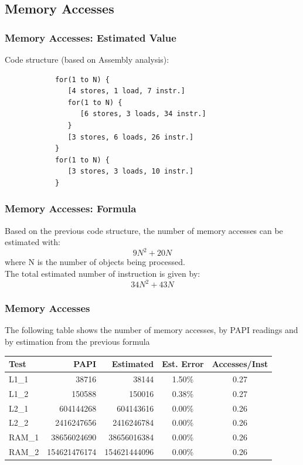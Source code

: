 \documentclass{beamer}
\begin{document}
\subsection{Memory Accesses}

\begin{frame}[fragile]
	\frametitle{Memory Accesses: Estimated Value}

	Code structure (based on Assembly analysis):
	\\
	\begin{center}
		\begin{lstlisting}
			for(1 to N) {
			   [4 stores, 1 load, 7 instr.]
			   for(1 to N) {
			      [6 stores, 3 loads, 34 instr.]
			   }
			   [3 stores, 6 loads, 26 instr.]
			}
			for(1 to N) {
			   [3 stores, 3 loads, 10 instr.]
			}
		\end{lstlisting}
	\end{center}
\end{frame}

\begin{frame}
	\frametitle{Memory Accesses: Formula}

	Based on the previous code structure, the number of memory accesses can be estimated with:
	$$9N^{2} + 20N$$
	where N is the number of objects being processed.
	\\
	The total estimated number of instruction is given by:
	$$34N^{2} + 43N$$
\end{frame}

\begin{frame}
	\frametitle{Memory Accesses}

	The following table shows the number of memory accesses, by PAPI readings and by estimation from the previous formula

	\begin{table}[!htp]
		\begin{center}
		{\small
			\begin{tabular}{|l|r|r|c|c|}
				
				\hline
				Test	&	PAPI					&	Estimated					&	Est. Error			&	 Accesses/Inst		\\
				\hline
				L1\_1	&	38716					&	38144						&	1.50\%				&	0.27						\\
				L1\_2	&	150588					&	150016						&	0.38\%				&	0.27						\\
				L2\_1	&	604144268				&	604143616					&	0.00\%				&	0.26						\\
				L2\_2	&	2416247656				&	2416246784					&	0.00\%				&	0.26						\\
				RAM\_1	&	38656024690				&	38656016384					&	0.00\%				&	0.26						\\
				RAM\_2	&	154621476174			&	154621444096				&	0.00\%				&	0.26						\\
				\hline
			\end{tabular}
		}
		\end{center}
	\end{table}
\end{frame}
\end{document}
